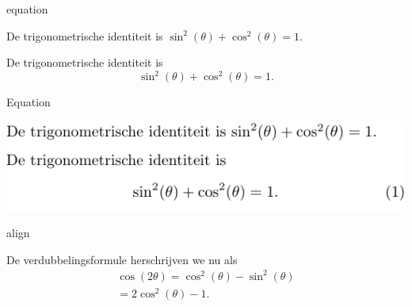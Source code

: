 \documentclass[presentatie.tex]{subfiles}
\begin{document}

\begin{saveblock}{equation}
	\begin{highlightblock}[gobble=8,linewidth=\textwidth,
		framexleftmargin=0.25em,xleftmargin=0.25em]
		De trigonometrische identiteit is
		$ \sin^2(\theta) + \cos^2(\theta) = 1 $.

		De trigonometrische identiteit is 
		\begin{equation}
			\sin^2(\theta) + \cos^2(\theta) = 1.
		\end{equation}
	\end{highlightblock}
\end{saveblock}



\begin{frame}{Equation}


	\includegraphics[width=\linewidth,height=0.4\textheight,keepaspectratio]{assets/5_Formules/mathEquation.pdf}

\end{frame}


\begin{saveblock}{align}
	\begin{highlightblock}[gobble=8,linewidth=\textwidth,
		framexleftmargin=0.25em,xleftmargin=0.25em]
		De verdubbelingsformule herschrijven we nu als
		\begin{align}
			\cos(2\theta) = \cos^2(\theta) - \sin^2(\theta)\\
			= 2\cos^2(\theta)-1.
		\end{align}
	\end{highlightblock}
\end{saveblock}
\end{document}
